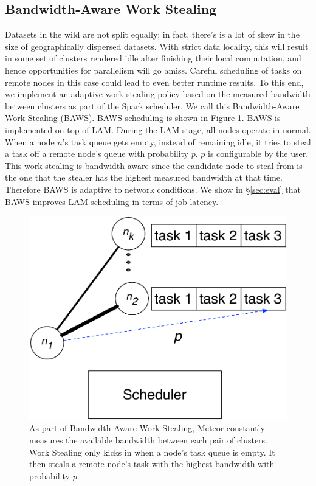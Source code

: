 \subsection{Bandwidth-Aware Work Stealing}

Datasets in the wild are not split equally; in fact, there's is a lot of skew in the size of geographically dispersed datasets.  With strict data locality, this will result in some set of clusters rendered idle after finishing their local computation, and hence opportunities for parallelism will go amiss.  Careful scheduling of tasks on remote nodes in this case could lead to even better runtime results. To this end, we implement an adaptive work-stealing policy based on the measured bandwidth between clusters as part of the Spark scheduler. We call this Bandwidth-Aware Work Stealing (BAWS). BAWS scheduling is shown in Figure \ref{fig:baws}. BAWS is implemented on top of LAM. During the LAM stage, all nodes operate in normal. When a node $n$'s task queue gets empty,
instead of remaining idle, it tries to steal a task off a remote node's queue with probability $p$. $p$ is configurable by the user. This work-stealing is bandwidth-aware since the candidate node to steal from is the one that the stealer has the highest measured bandwidth at that time. Therefore BAWS is adaptive to network conditions. 
We show in \S \ref{sec:eval}  that BAWS improves LAM scheduling in terms of job latency.

\begin{figure}[!ht]
\centering\includegraphics[width=0.5\columnwidth]{figs/BOSS.pdf}
\vspace{-1.2em}
\caption{As part of Bandwidth-Aware Work Stealing, Meteor constantly measures the available bandwidth between each pair of clusters. Work Stealing only kicks in when a node's task queue is empty. It then steals a remote node's task with the highest bandwidth with probability $p$. }
\label{fig:baws}
\vspace{.7em}
\end{figure}

